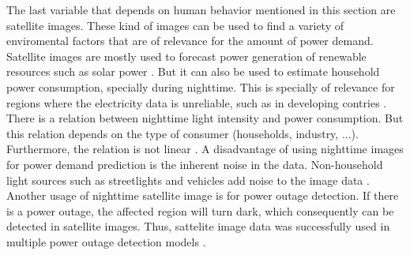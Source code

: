 The last variable that depends on human behavior mentioned in this section are
satellite images. These kind of images can be used to find a variety 
of enviromental factors that are of relevance for the amount of power demand.
Satellite images are mostly used to forecast power generation of 
renewable resources such as solar power \cite{solarprediction}.
But it can also be used to estimate household power consumption,
specially during nighttime. This is specially of relevance for regions 
where the electricity data is unreliable, such as in developing contries
\cite{reviewnighttime}. There is a relation 
between nighttime light intensity and power consumption.
But this relation depends on the type of consumer 
(households, industry, ...). Furthermore, the relation is not linear
\cite{nighttimepowerestimation}. 
A disadvantage of using nighttime images for power demand prediction is 
the inherent noise in the data. Non-household light sources such as 
streetlights and vehicles add noise to the image data \cite{reviewnighttime}.
Another usage of nighttime satellite image is for power outage detection.
If there is a power outage, the affected region will turn dark, which 
consequently can be detected in satellite images. Thus, sattelite image data 
was successfully used in multiple power outage detection models
\cite{nightpoweroutage} \cite{twitterpoweroutagelighttime}.